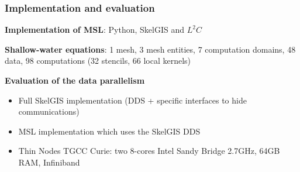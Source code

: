 \documentclass{beamer}
\begin{document}
\begin{frame}
\frametitle{Implementation and evaluation}
\textbf{Implementation of MSL}: Python, SkelGIS and $L^2C$

\medskip
\textbf{Shallow-water equations}: 1 mesh, 3 mesh entities, 7 computation domains, 48 data, 98 computations (32 stencils, 66 local kernels)

\medskip
\textbf{Evaluation of the data parallelism}
\begin{itemize}
\item Full SkelGIS implementation (DDS + specific interfaces to hide communications)
\item MSL implementation which uses the SkelGIS DDS
\item Thin Nodes TGCC Curie: two 8-cores Intel Sandy Bridge 2.7GHz, 64GB RAM, Infiniband
\end{itemize}
\end{frame}
\end{document}
